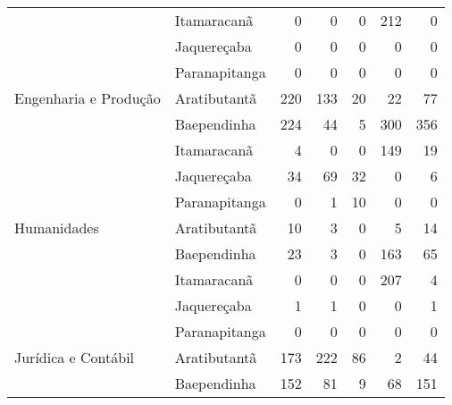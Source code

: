 \begin{table}[ht]
\begin{tabular}{ll rrrrr}
                          & Itamaracanã             &           0 &            0 &                  0 &              212 &          0 \\ 
                          & Jaquereçaba             &           0 &            0 &                  0 &                0 &          0 \\ 
                          & Paranapitanga           &           0 &            0 &                  0 &                0 &          0 \\ 
  Engenharia e Produção   & Aratibutantã            &         220 &          133 &                 20 &               22 &         77 \\ 
                          & Baependinha             &         224 &           44 &                  5 &              300 &        356 \\ 
                          & Itamaracanã             &           4 &            0 &                  0 &              149 &         19 \\ 
                          & Jaquereçaba             &          34 &           69 &                 32 &                0 &          6 \\ 
                          & Paranapitanga           &           0 &            1 &                 10 &                0 &          0 \\ 
  Humanidades             & Aratibutantã            &          10 &            3 &                  0 &                5 &         14 \\ 
                          & Baependinha             &          23 &            3 &                  0 &              163 &         65 \\ 
                          & Itamaracanã             &           0 &            0 &                  0 &              207 &          4 \\ 
                          & Jaquereçaba             &           1 &            1 &                  0 &                0 &          1 \\ 
                          & Paranapitanga           &           0 &            0 &                  0 &                0 &          0 \\ 
  Jurídica e Contábil     & Aratibutantã            &         173 &          222 &                 86 &                2 &         44 \\ 
                          & Baependinha             &         152 &           81 &                  9 &               68 &        151 \\ 

\end{tabular}
\end{table}

